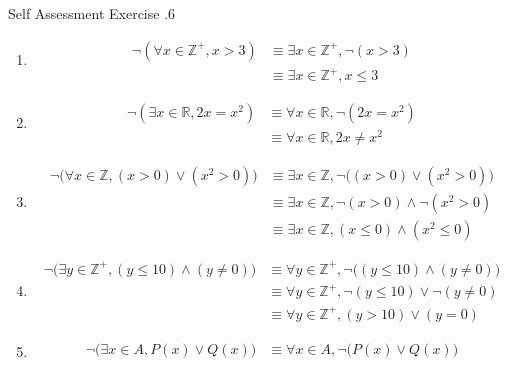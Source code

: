\documentclass[\main/notes.tex]{subfiles}
\begin{document}
			\begin{exercise}{Self Assessment Exercise \thechapter.6}
				\begin{enumerate}[label=(\alph*)]
					\item {}
						\begin{align*}
							\lnot (\forall x \in \mathbb{Z}^{+}, x > 3) &\equiv \exists x \in \mathbb{Z}^{+}, \lnot (x > 3)\\
							& \equiv \exists x \in \mathbb{Z}^{+}, x \leq 3
						\end{align*}
					\item {}
						\begin{align*}
							\lnot (\exists x \in \mathbb{R}, 2x = x^{2}) & \equiv \forall x \in \mathbb{R}, \lnot(2x = x^{2})\\
							& \equiv \forall x \in \mathbb{R}, 2x \neq x^{2}
						\end{align*}
					\item {}
						\begin{align*}
							\lnot \bigl(\forall x \in \mathbb{Z}, (x > 0) \lor (x^{2} > 0)\bigr) & \equiv \exists x \in \mathbb{Z}, \lnot \bigl((x > 0) \lor (x^{2} > 0)\bigr)\\
							& \equiv \exists x \in \mathbb{Z}, \lnot (x > 0) \land \lnot (x^{2} > 0)\\
							& \equiv \exists x \in \mathbb{Z}, (x \leq 0) \land (x^{2} \leq 0)
						\end{align*}
					\item {}
						\begin{align*}
							\lnot \bigl(\exists y \in \mathbb{Z}^{+}, (y \leq 10) \land (y \neq 0)\bigr) & \equiv \forall y \in \mathbb{Z}^{+}, \lnot \bigl((y \leq 10) \land (y \neq 0)\bigr)\\
							& \equiv \forall y \in \mathbb{Z}^{+}, \lnot (y \leq 10) \lor \lnot (y \neq 0)\\
							& \equiv \forall y \in \mathbb{Z}^{+}, (y > 10) \lor (y = 0)
						\end{align*}
					\item {}
						\begin{align*}
							\lnot \bigl(\exists x \in A, P(x) \lor Q(x)\bigr) & \equiv \forall x \in A, \lnot \bigl(P(x) \lor Q(x)\bigr)\\

\end{align*}
\end{enumerate}
\end{exercise}
\end{document}
